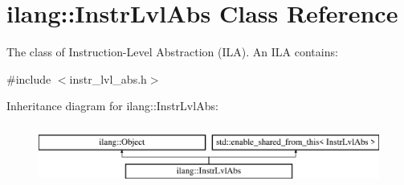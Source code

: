 \hypertarget{classilang_1_1_instr_lvl_abs}{}\section{ilang\+:\+:Instr\+Lvl\+Abs Class Reference}
\label{classilang_1_1_instr_lvl_abs}


The class of Instruction-\/\+Level Abstraction (I\+LA). An I\+LA contains\+:  




{\ttfamily \#include $<$instr\+\_\+lvl\+\_\+abs.\+h$>$}

Inheritance diagram for ilang\+:\+:Instr\+Lvl\+Abs\+:\begin{figure}[H]
\begin{center}
\leavevmode
\includegraphics[height=2.000000cm]{classilang_1_1_instr_lvl_abs}
\end{center}
\end{figure}
